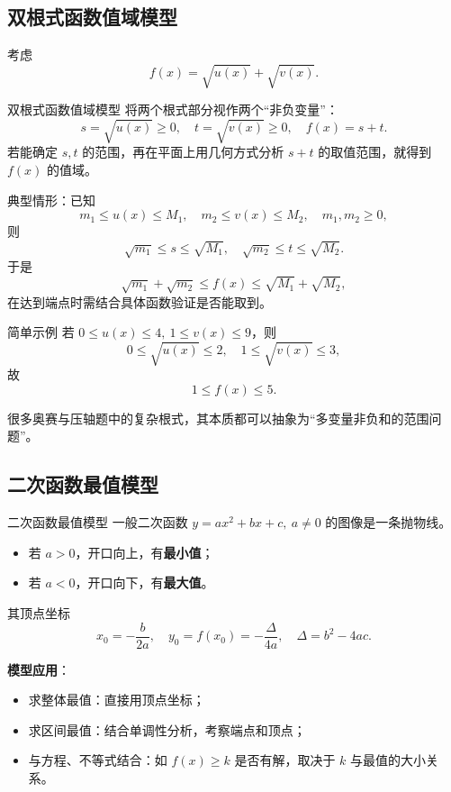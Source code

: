 \documentclass[a4paper,11pt]{ctexart}
\begin{document}
\subsection{双根式函数值域模型}

考虑
\[
  f(x) = \sqrt{u(x)} + \sqrt{v(x)}.
\]

\begin{definitionbox}{双根式函数值域模型}
  将两个根式部分视作两个“非负变量”：
  \[
    s = \sqrt{u(x)}\ge0,\quad t=\sqrt{v(x)}\ge0,\quad f(x)=s+t.
  \]
  若能确定 $s,t$ 的范围，再在平面上用几何方式分析 $s+t$ 的取值范围，就得到 $f(x)$ 的值域。
\end{definitionbox}

典型情形：已知
\[
  m_1\le u(x)\le M_1,\quad m_2\le v(x)\le M_2,\quad m_1,m_2\ge0,
\]
则
\[
  \sqrt{m_1}\le s\le\sqrt{M_1},\quad \sqrt{m_2}\le t\le\sqrt{M_2}.
\]
于是
\[
  \sqrt{m_1}+\sqrt{m_2}\le f(x)\le\sqrt{M_1}+\sqrt{M_2},
\]
在达到端点时需结合具体函数验证是否能取到。

\begin{examplebox}[mathnote coverage=line]{简单示例}
  若 $0\le u(x)\le4,\ 1\le v(x)\le9$，则
  \[
    0\le\sqrt{u(x)}\le2,\quad 1\le\sqrt{v(x)}\le3,
  \]
  故
  \[
    1\le f(x)\le5.
  \]
\end{examplebox}

很多奥赛与压轴题中的复杂根式，其本质都可以抽象为“多变量非负和的范围问题”。

\subsection{二次函数最值模型}

\begin{definitionbox}{二次函数最值模型}
  一般二次函数 $y=ax^2+bx+c,\ a\ne0$ 的图像是一条抛物线。
  \begin{itemize}
    \item 若 $a>0$，开口向上，有\textbf{最小值}；
    \item 若 $a<0$，开口向下，有\textbf{最大值}。
  \end{itemize}
  其顶点坐标
  \[
    x_0=-\frac{b}{2a},\quad y_0=f(x_0)= -\frac{\Delta}{4a},\quad\Delta=b^2-4ac.
  \]
\end{definitionbox}

\textbf{模型应用}：

\begin{itemize}
  \item 求整体最值：直接用顶点坐标；
  \item 求区间最值：结合单调性分析，考察端点和顶点；
  \item 与方程、不等式结合：如 $f(x)\ge k$ 是否有解，取决于 $k$ 与最值的大小关系。
\end{itemize}
\end{document}
